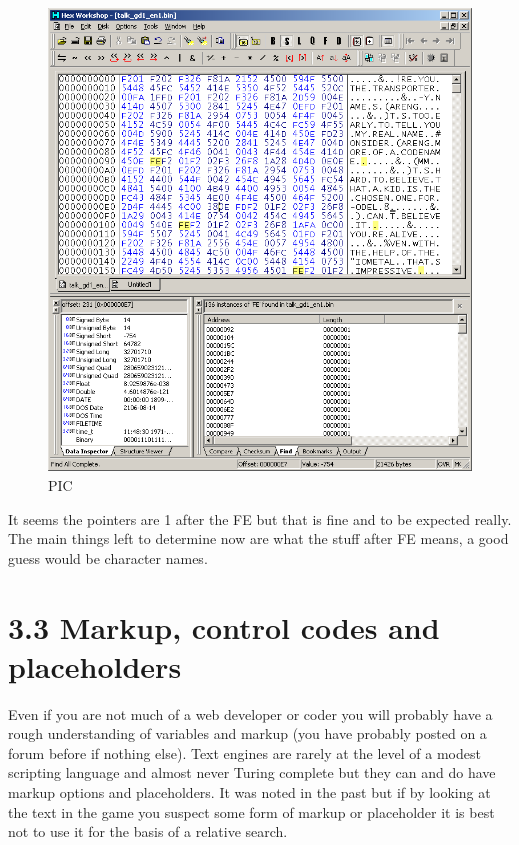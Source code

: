 \documentclass[
]{book}
\begin{document}
\begin{figure}
\centering
\includegraphics{images/105_home_fast6191_romhackingguide_unrenamed_fil___borders_romhackingguidepointersexamplehexw4.png}
\caption{PIC}
\end{figure}

It seems the pointers are 1 after the FE but that is fine and to be expected really. The main things left to determine now are what the stuff after FE means, a good guess would be character names.

\hypertarget{markup-control-codes-and-placeholders}{%
\section{3.3 Markup, control codes and placeholders}\label{markup-control-codes-and-placeholders}}

Even if you are not much of a web developer or coder you will probably have a rough understanding of variables and markup (you have probably posted on a forum before if nothing else). Text engines are rarely at the level of a modest scripting language and almost never Turing complete but they can and do have markup options and placeholders. It was noted in the past but if by looking at the text in the game you suspect some form of markup or placeholder it is best not to use it for the basis of a relative search.
\end{document}
